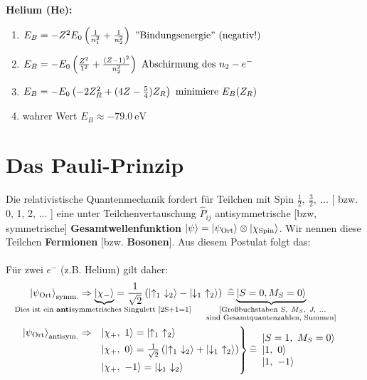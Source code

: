 \documentclass[Ex4_Zusammenfassung.tex]{subfiles}
\begin{document}
\textbf{Helium (He):}
\begin{enumerate}
	\item $E_B = - Z^2 E_0 \left( \frac{1}{n_1^2} + \frac{1}{n_2^2} \right) \ \text{''Bindungsenergie'' (negativ!)}$
	\item $E_B = - E_0 \left( \frac{Z^2}{1^2} + \frac{(Z-1)^2}{n_2^2} \right)\ \text{Abschirmung des } n_2-e^-$
	\item $E_B = -E_0 \left(-2Z_R^2 + (4Z - \frac{5}{4}) Z_R \right)\ \text{minimiere } E_B(Z_R) $
	\item wahrer Wert $ E_B \approx \SI{-79.0}{\eV}$
\end{enumerate}

\section{Das Pauli-Prinzip}
Die relativistische Quantenmechanik fordert für Teilchen mit Spin $\frac{1}{2},\ \frac{3}{2},\ ... $ [ bzw. 0, 1, 2, ... ] eine unter Teilchenvertauschung $\hat{P}_{ij} $ antisymmetrische [bzw, symmetrische] \textbf{Gesamtwellenfunktion} $ \ket{\psi} = \ket{\psi_{\text{Ort}}} \otimes \ket{\chi_{\text{Spin}}} $. Wir nennen diese Teilchen \textbf{Fermionen} [bzw. \textbf{Bosonen}]. Aus diesem Postulat folgt das:\\


\\

Für zwei $e^-$ (z.B. Helium) gilt daher:
\begin{align*}
	\ket{\psi_{\text{Ort}}}_{\text{symm.}} &\Rightarrow \underbrace{\ket{\chi_-}}_{\mathclap{\text{Dies ist ein \textbf{anti}symmetrisches Singulett [2S+1=1] }}} = \frac{1}{\sqrt{2}} \lp \ket{\uparrow_1\ \downarrow_2} - \ket{\downarrow_1\ \uparrow_2} \rp\  \widehat{=} \underbrace{\ket{S=0, M_S=0}}_{\mathclap{\substack{\text{ [Großbuchstaben } S,\ M_S,\ J,\ ... \\ \text{ sind Gesamtquantenzahlen, Summen] } }} }\\
	& \kern -5.95em \begin{rcases}
		\ket{\psi_{\text{Ort}}}_{\text{antisym.}} \Rightarrow &\ket{\chi_+ ,\ 1} = \ket{\uparrow_1\ \uparrow_2} \\
		&\ket{\chi_+ ,\ 0} = \frac{1}{\sqrt{2}} \lp \ket{\uparrow_1\ \downarrow_2} + \ket{\downarrow_1\ \uparrow_2} \rp\\
		&\ket{\chi_+ ,\ -1} = \ket{\downarrow_1\ \downarrow_2}
	\end{rcases} 
	\widehat{=} 
		\begin{array}{l}
			\ket{S=1,\ M_S=0}\\
			\ket{1,\ 0}\\
			\ket{1,\ -1}
		\end{array}
\end{align*}
\end{document}
